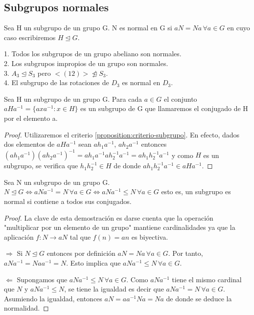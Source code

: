 \subsection{Subgrupos normales}

\begin{definition}
Sea H un subgrupo de un grupo G. N es normal en G si $aN = Na \, \forall a \in G$ en cuyo caso escribiremos $H \unlhd G$.
\end{definition}

\begin{example}
1. Todos los subgrupos de un grupo abeliano son normales.\\
2. Los subgrupos impropios de un grupo son normales.\\
3. $A_3 \trianglelefteq S_3$ pero $<(12)> \ntrianglelefteq S_3$.\\
4. El subgrupo de las rotaciones de $D_3$ es normal en $D_3$.
\end{example}

\begin{lemma}
Sea H un subgrupo de un grupo G. Para cada $a \in G$ el conjunto $aHa^{-1} = \{axa^{-1}:x \in H\}$ es un subgrupo de G que llamaremos el conjugado de H por el elemento a. 
\end{lemma}
\begin{proof}
Utilizaremos el criterio \ref{proposition:criterio-subgrupo}. En efecto, dados dos elementos de $aHa^{-1}$ sean $ah_1a^{-1}$, $ah_2a^{-1}$ entonces $(ah_1a^{-1})(ah_2a^{-1})^{-1} = ah_1a^{-1}ah_2^{-1}a^{-1} = ah_1h_2^{-1}a^{-1}$ y como $H$ es un subgrupo, se verifica que $h_1h_2^{-1} \in H$ de donde $ah_1h_2^{-1}a^{-1} \in aHa^{-1}$.
\end{proof}

\begin{theorem}\label{theorem:criterio-normalidad}
Sea N un subgrupo de un grupo G. $N \unlhd G \iff aNa^{-1} = N  \, \forall a \in G \iff aNa^{-1} \le N \, \forall a \in G$ esto es, un subgrupo es normal si contiene a todos sus conjugados.
\end{theorem}
\begin{proof}
La clave de esta demostración es darse cuenta que la operación "multiplicar por un elemento de un grupo" mantiene cardinalidades ya que la aplicación $f:N \rightarrow aN$ tal que $f(n) = an$ es biyectiva.

$\Rightarrow$ Si $N \unlhd G$ entonces por definición $aN = Na \, \forall a \in G$. Por tanto, $aNa^{-1} = Naa^{-1} = N$. Esto implica que $aNa^{-1} \le N \, \forall a \in G$.

$\Leftarrow$ Supongamos que $aNa^{-1} \le N \, \forall a \in G$. Como $aNa^{-1}$ tiene el mismo cardinal que $N$ y $aNa^{-1} \le N$, se tiene la igualdad es decir que $aNa^{-1} = N \, \forall a \in G$. Asumiendo la igualdad, entonces $aN = aa^{-1}Na = Na$ de donde se deduce la normalidad.
\end{proof}

